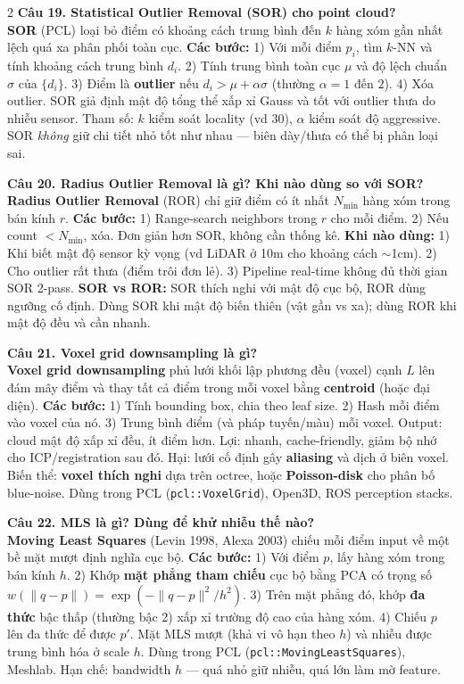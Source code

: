 \begin{paracol}{2}
\textbf{Câu 19. Statistical Outlier Removal (SOR) cho point cloud?}\\
\textbf{SOR} (PCL) loại bỏ điểm có khoảng cách trung bình đến $k$ hàng xóm gần nhất lệch quá xa phân phối toàn cục. \textbf{Các bước:} 1) Với mỗi điểm $p_i$, tìm $k$-NN và tính khoảng cách trung bình $d_i$. 2) Tính trung bình toàn cục $\mu$ và độ lệch chuẩn $\sigma$ của $\{d_i\}$. 3) Điểm là \textbf{outlier} nếu $d_i>\mu+\alpha\sigma$ (thường $\alpha=1$ đến $2$). 4) Xóa outlier. SOR giả định mật độ tổng thể xấp xỉ Gauss và tốt với outlier thưa do nhiễu sensor. Tham số: $k$ kiểm soát locality (vd 30), $\alpha$ kiểm soát độ aggressive. SOR \textit{không} giữ chi tiết nhỏ tốt như nhau — biên dày/thưa có thể bị phân loại sai.

\textbf{Câu 20. Radius Outlier Removal là gì? Khi nào dùng so với SOR?}\\
\textbf{Radius Outlier Removal} (ROR) chỉ giữ điểm có ít nhất $N_{\min}$ hàng xóm trong bán kính $r$. \textbf{Các bước:} 1) Range-search neighbors trong $r$ cho mỗi điểm. 2) Nếu count $<N_{\min}$, xóa. Đơn giản hơn SOR, không cần thống kê. \textbf{Khi nào dùng:} 1) Khi biết mật độ sensor kỳ vọng (vd LiDAR ở 10m cho khoảng cách $\sim$1cm). 2) Cho outlier rất thưa (điểm trôi đơn lẻ). 3) Pipeline real-time không đủ thời gian SOR 2-pass. \textbf{SOR vs ROR:} SOR thích nghi với mật độ cục bộ, ROR dùng ngưỡng cố định. Dùng SOR khi mật độ biến thiên (vật gần vs xa); dùng ROR khi mật độ đều và cần nhanh.

\textbf{Câu 21. Voxel grid downsampling là gì?}\\
\textbf{Voxel grid downsampling} phủ lưới khối lập phương đều (voxel) cạnh $L$ lên đám mây điểm và thay tất cả điểm trong mỗi voxel bằng \textbf{centroid} (hoặc đại diện). \textbf{Các bước:} 1) Tính bounding box, chia theo leaf size. 2) Hash mỗi điểm vào voxel của nó. 3) Trung bình điểm (và pháp tuyến/màu) mỗi voxel. Output: cloud mật độ xấp xỉ đều, ít điểm hơn. Lợi: nhanh, cache-friendly, giảm bộ nhớ cho ICP/registration sau đó. Hại: lưới cố định gây \textbf{aliasing} và dịch ở biên voxel. Biến thể: \textbf{voxel thích nghi} dựa trên octree, hoặc \textbf{Poisson-disk} cho phân bố blue-noise. Dùng trong PCL (\verb|pcl::VoxelGrid|), Open3D, ROS perception stacks.

\textbf{Câu 22. MLS là gì? Dùng để khử nhiễu thế nào?}\\
\textbf{Moving Least Squares} (Levin 1998, Alexa 2003) chiếu mỗi điểm input về một bề mặt mượt định nghĩa cục bộ. \textbf{Các bước:} 1) Với điểm $p$, lấy hàng xóm trong bán kính $h$. 2) Khớp \textbf{mặt phẳng tham chiếu} cục bộ bằng PCA có trọng số $w(\|q-p\|)=\exp(-\|q-p\|^2/h^2)$. 3) Trên mặt phẳng đó, khớp \textbf{đa thức} bậc thấp (thường bậc 2) xấp xỉ trường độ cao của hàng xóm. 4) Chiếu $p$ lên đa thức để được $p'$. Mặt MLS mượt (khả vi vô hạn theo $h$) và nhiễu được trung bình hóa ở scale $h$. Dùng trong PCL (\verb|pcl::MovingLeastSquares|), Meshlab. Hạn chế: bandwidth $h$ — quá nhỏ giữ nhiễu, quá lớn làm mờ feature.


\end{paracol}
